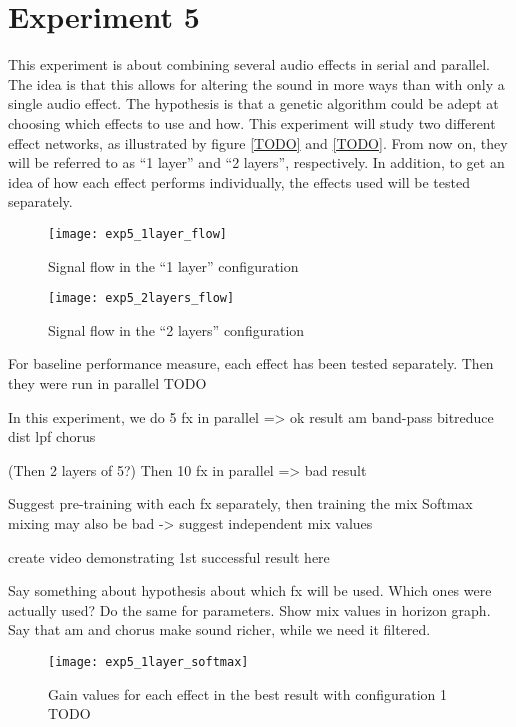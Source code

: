 \section{Experiment 5}
This experiment is about combining several audio effects in serial and parallel. The idea is that this allows for altering the sound in more ways than with only a single audio effect. The hypothesis is that a genetic algorithm could be adept at choosing which effects to use and how. This experiment will study two different effect networks, as illustrated by figure \ref{TODO} and \ref{TODO}. From now on, they will be referred to as ``1 layer'' and ``2 layers'', respectively. In addition, to get an idea of how each effect performs individually, the effects used will be tested separately.

\begin{figure}[h]
    \centering
    \texttt{[image: exp5\_1layer\_flow]}
    \caption{Signal flow in the ``1 layer'' configuration}
    \label{fig:exp5_1layer_flow}
\end{figure}

\begin{figure}[h]
    \centering
    \texttt{[image: exp5\_2layers\_flow]}
    \caption{Signal flow in the ``2 layers'' configuration}
    \label{fig:exp5_2layers_flow}
\end{figure}

For baseline performance measure, each effect has been tested separately. Then they were run in parallel TODO



In this experiment, we do 5 fx in parallel => ok result
am
band-pass
bitreduce
dist lpf
chorus

(Then 2 layers of 5?)
Then 10 fx in parallel => bad result

Suggest pre-training with each fx separately, then training the mix
Softmax mixing may also be bad -> suggest independent mix values

create video demonstrating 1st successful result here

Say something about hypothesis about which fx will be used. Which ones were actually used? Do the same for parameters. Show mix values in horizon graph. Say that am and chorus make sound richer, while we need it filtered.

\begin{figure}[h]
    \centering
    \texttt{[image: exp5\_1layer\_softmax]}
    \caption{Gain values for each effect in the best result with configuration 1 TODO}
    \label{fig:exp5_1layer_softmax}
\end{figure}

